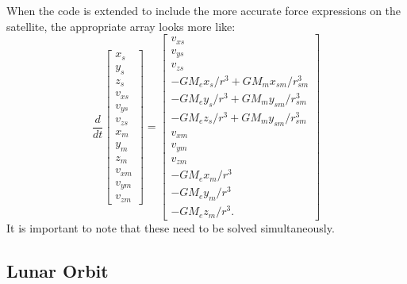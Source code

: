 \documentclass{article}
\begin{document}
When the code is extended to
include the more accurate force expressions on the satellite, the
appropriate array looks more like:
\begin{equation}
  \frac{d}{dt}
  \begin{bmatrix}
    x_s \\ y_s \\ z_s \\ v_{xs} \\ v_{ys} \\ v_{zs} \\
    x_m \\ y_m \\ z_m \\ v_{xm} \\ v_{ym} \\ v_{zm}
  \end{bmatrix} =
  \begin{bmatrix}
    v_{xs} \\ v_{ys} \\ v_{zs} \\
    -GM_ex_s/r^3+GM_mx_{sm}/r_{sm}^3 \\
    -GM_ey_s/r^3+GM_my_{sm}/r_{sm}^3 \\
    -GM_ez_s/r^3+GM_my_{sm}/r_{sm}^3 \\
    v_{xm} \\ v_{ym} \\ v_{zm} \\
    -GM_ex_m/r^3 \\
    -GM_ey_m/r^3 \\
    -GM_ez_m/r^3.
  \end{bmatrix}
  \label{eq:eom}  
\end{equation}
It is important to note that these need to be solved simultaneously.

\subsection{Lunar Orbit}
\end{document}
